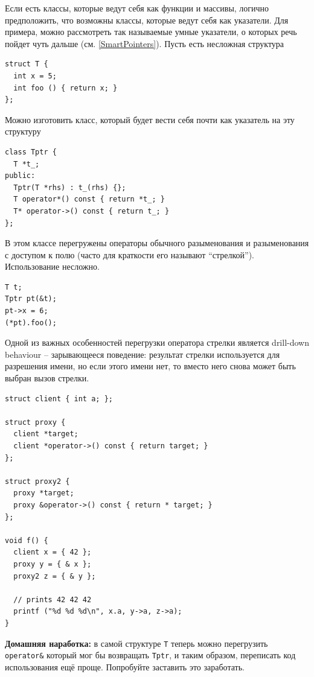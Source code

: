 \documentclass[a4paper,12pt,oneside]{book}
\begin{document}
Если есть классы, которые ведут себя как функции и массивы, логично предположить, что возможны классы, которые ведут себя как указатели. Для примера, можно рассмотреть так называемые умные указатели, о которых речь пойдет чуть дальше (см. \ref{SmartPointers}). Пусть есть несложная структура

\begin{lstlisting}
struct T {
  int x = 5;
  int foo () { return x; }
};
\end{lstlisting}

Можно изготовить класс, который будет вести себя почти как указатель на эту структуру

\begin{lstlisting}
class Tptr {
  T *t_;
public:
  Tptr(T *rhs) : t_(rhs) {};
  T operator*() const { return *t_; }
  T* operator->() const { return t_; }
};
\end{lstlisting}

В этом классе перегружены операторы обычного разыменования и разыменования с доступом к полю (часто для краткости его называют ``стрелкой''). Использование несложно.

\begin{lstlisting}
T t;
Tptr pt(&t);
pt->x = 6;
(*pt).foo();
\end{lstlisting}

Одной из важных особенностей перегрузки оператора стрелки является drill-down behaviour  -- зарывающееся поведение: результат стрелки используется для разрешения имени, но если этого имени нет, то вместо него снова может быть выбран вызов стрелки.

\begin{lstlisting}
struct client { int a; };

struct proxy {
  client *target;
  client *operator->() const { return target; }
};

struct proxy2 {
  proxy *target;
  proxy &operator->() const { return * target; }
};

void f() {
  client x = { 42 };
  proxy y = { & x };
  proxy2 z = { & y };

  // prints 42 42 42
  printf ("%d %d %d\n", x.a, y->a, z->a);    
}
\end{lstlisting}

\textbf{Домашняя наработка:} в самой структуре \lstinline!T! теперь можно перегрузить \lstinline!operator&! который мог бы возвращать \lstinline!Tptr!, и таким образом, переписать код использования ещё проще. Попробуйте заставить это заработать.
\end{document}
